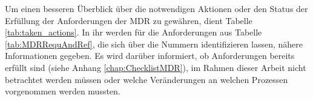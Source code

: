 \documentclass[a4paper,12pt]{report}
\begin{document}
Um einen besseren Überblick über die notwendigen Aktionen oder den Status der Erfüllung der Anforderungen der MDR zu gewähren, dient Tabelle \ref{tab:taken_actions}. In ihr werden für die Anforderungen aus Tabelle \ref{tab:MDRRequAndRef}, die sich über die Nummern identifizieren lassen, nähere Informationen gegeben. Es wird darüber informiert, ob Anforderungen bereits erfüllt sind (siehe Anhang \ref{chap:ChecklistMDR}), im Rahmen dieser Arbeit nicht betrachtet werden müssen oder welche Veränderungen an welchen Prozessen vorgenommen werden mussten.
\def\Nr{\stepcounter{NrCounter}\theNrCounter}
\def\LineInTraceTable#1{\Nr & #1\\ \hline}
\def\LineInTraceTableChecked{\Nr & Anforderung bereits erfüllt\\ \hline}
\def\LineInTraceTableNotInFocus{\Nr & Außerhalb Fokus der Arbeit\\ \hline}
\setlength{\LTcapwidth}{\textwidth}
\end{document}
